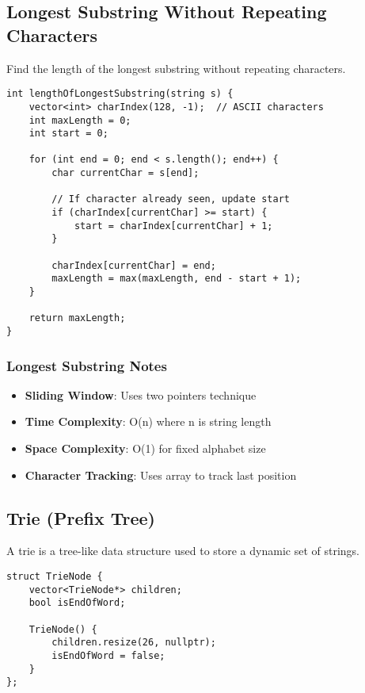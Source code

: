 \documentclass[11pt,a4paper]{article}
\begin{document}
\newpage
\subsection{Longest Substring Without Repeating Characters}
Find the length of the longest substring without repeating characters.

\begin{lstlisting}[caption={Longest Substring Without Repeating Characters}]
int lengthOfLongestSubstring(string s) {
    vector<int> charIndex(128, -1);  // ASCII characters
    int maxLength = 0;
    int start = 0;
    
    for (int end = 0; end < s.length(); end++) {
        char currentChar = s[end];
        
        // If character already seen, update start
        if (charIndex[currentChar] >= start) {
            start = charIndex[currentChar] + 1;
        }
        
        charIndex[currentChar] = end;
        maxLength = max(maxLength, end - start + 1);
    }
    
    return maxLength;
}
\end{lstlisting}

\subsubsection*{Longest Substring Notes}
\begin{itemize}
\item \textbf{Sliding Window}: Uses two pointers technique
\item \textbf{Time Complexity}: O(n) where n is string length
\item \textbf{Space Complexity}: O(1) for fixed alphabet size
\item \textbf{Character Tracking}: Uses array to track last position
\end{itemize}

\newpage
\subsection{Trie (Prefix Tree)}
A trie is a tree-like data structure used to store a dynamic set of strings.

\begin{lstlisting}[caption={Trie Node Implementation}]
struct TrieNode {
    vector<TrieNode*> children;
    bool isEndOfWord;
    
    TrieNode() {
        children.resize(26, nullptr);
        isEndOfWord = false;
    }
};
\end{lstlisting}
\end{document}
